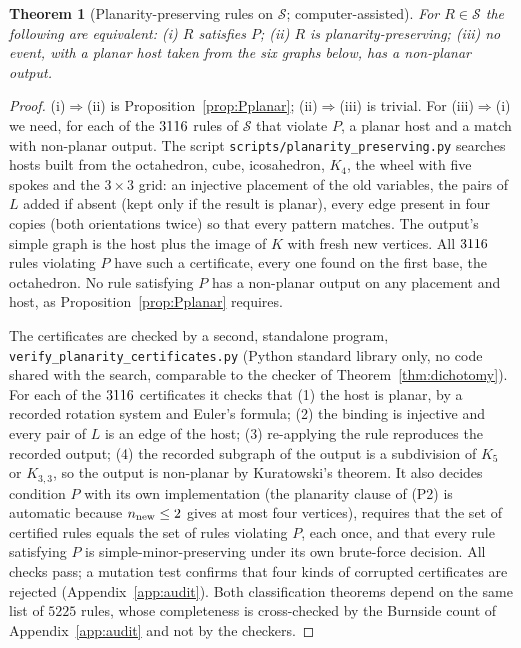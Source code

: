 \documentclass[10pt]{article}
\theoremstyle{definition}
\theoremstyle{plain}
\newtheorem{theorem}{Theorem}
\theoremstyle{remark}
\begin{document}
\begin{theorem}[Planarity-preserving rules on $\mathcal S$; computer-assisted]\label{thm:planarity}
For $R\in\mathcal S$ the following are equivalent: (i) $R$ satisfies $P$; (ii) $R$ is planarity-preserving; (iii) no event, with a planar host taken from the six graphs below, has a non-planar output.
\end{theorem}
\begin{proof}
(i)$\Rightarrow$(ii) is Proposition~\ref{prop:Pplanar}; (ii)$\Rightarrow$(iii) is trivial. For (iii)$\Rightarrow$(i) we need, for each of the $3116$ rules of $\mathcal S$ that violate $P$, a planar host and a match with non-planar output. The script \texttt{scripts/planarity\_preserving.py} searches hosts built from the octahedron, cube, icosahedron, $K_4$, the wheel with five spokes and the $3\times3$ grid: an injective placement of the old variables, the pairs of $L$ added if absent (kept only if the result is planar), every edge present in four copies (both orientations twice) so that every pattern matches. The output's simple graph is the host plus the image of $K$ with fresh new vertices. All $3116$ rules violating $P$ have such a certificate, every one found on the first base, the octahedron. No rule satisfying $P$ has a non-planar output on any placement and host, as Proposition~\ref{prop:Pplanar} requires.

The certificates are checked by a second, standalone program, \texttt{verify\_planarity\_certificates.py} (Python standard library only, no code shared with the search, comparable to the checker of Theorem~\ref{thm:dichotomy}). For each of the $3116$ certificates it checks that (1) the host is planar, by a recorded rotation system and Euler's formula; (2) the binding is injective and every pair of $L$ is an edge of the host; (3) re-applying the rule reproduces the recorded output; (4) the recorded subgraph of the output is a subdivision of $K_5$ or $K_{3,3}$, so the output is non-planar by Kuratowski's theorem. It also decides condition $P$ with its own implementation (the planarity clause of (P2) is automatic because $n_{\rm new}\le2$ gives at most four vertices), requires that the set of certified rules equals the set of rules violating $P$, each once, and that every rule satisfying $P$ is simple-minor-preserving under its own brute-force decision. All checks pass; a mutation test confirms that four kinds of corrupted certificates are rejected (Appendix~\ref{app:audit}). Both classification theorems depend on the same list of $5225$ rules, whose completeness is cross-checked by the Burnside count of Appendix~\ref{app:audit} and not by the checkers.
\end{proof}
\end{document}
